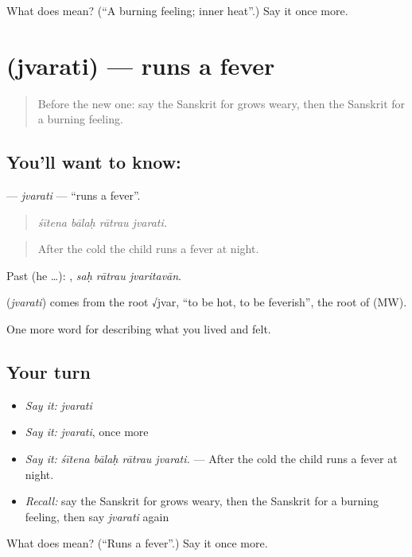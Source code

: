 \begin{tcolorbox}[breakable,colback=teal!4,colframe=teal!35!black,title={Before you move on}]
What does  mean? (\textquotedblleft{}A burning feeling; inner heat\textquotedblright{}.) Say it once more.
\end{tcolorbox}
\section[\texorpdfstring{\sk{ज्वरति} (jvarati)}{ज्वरति (jvarati)}]{ (jvarati) — runs a fever}

\label{lesson:SA-C477-jvarati}



\begin{quote}
Before the new one: say the Sanskrit for grows weary, then the Sanskrit for a burning feeling.
\end{quote}

\subsection*{You'll want to know: }
\textbf{} — \emph{jvarati} — \textquotedblleft{}runs a fever\textquotedblright{}.

\begin{quote}
   
\end{quote}

\begin{quote}
\emph{śītena bālaḥ rātrau jvarati.}
\end{quote}

\begin{quote}
After the cold the child runs a fever at night.
\end{quote}

Past (he …):   , \emph{saḥ rātrau jvaritavān}.

\begin{cousinweb}
\textbf{} (\emph{jvarati}) comes from the root √jvar, \textquotedblleft{}to be hot, to be feverish\textquotedblright{}, the root of \textbf{} (MW).
\end{cousinweb}

\begin{grammarlens}[title={What you've built}]
One more word for describing what you lived and felt.
\end{grammarlens}

\subsection*{Your turn}
\begin{itemize}
\raggedright
  \item \emph{Say it:} \emph{jvarati}
  \item \emph{Say it:} \emph{jvarati}, once more
  \item \emph{Say it:} \emph{śītena bālaḥ rātrau jvarati.} — After the cold the child runs a fever at night.
  \item \emph{Recall:} say the Sanskrit for grows weary, then the Sanskrit for a burning feeling, then say \emph{jvarati} again
\end{itemize}

\begin{tcolorbox}[breakable,colback=teal!4,colframe=teal!35!black,title={Before you move on}]
What does  mean? (\textquotedblleft{}Runs a fever\textquotedblright{}.) Say it once more.
\end{tcolorbox}
